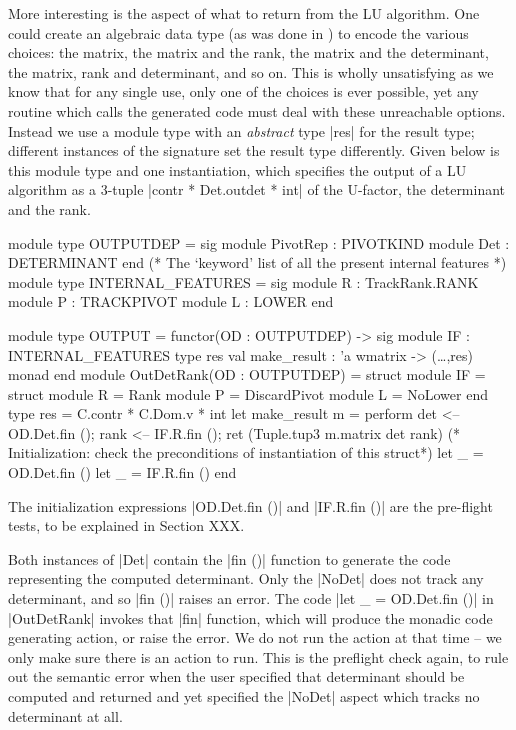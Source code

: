 \documentclass[draft]{elsart}
\begin{document}
More interesting is the aspect of what to return
from the LU algorithm.  One could create an algebraic data type (as
was done in \cite{Carette06}) to encode the various choices: the
matrix, the matrix and the rank, the matrix and the determinant, the
matrix, rank and determinant, and so on. This is wholly unsatisfying
as we know that for any single use, only one of the choices is ever
possible, yet any routine which calls the generated code must deal
with these unreachable options.  Instead we use a module type with an
\emph{abstract} type |res| for the result type; different instances of
the signature set the result type differently. Given below is this
module type and one instantiation, which specifies the output of a LU
algorithm as a 3-tuple |contr * Det.outdet * int| of the U-factor, the
determinant and the rank.

\begin{code2}
module type OUTPUTDEP = sig 
    module PivotRep : PIVOTKIND 
    module Det      : DETERMINANT
end
(* The `keyword' list of all the present internal features *)
module type INTERNAL_FEATURES = sig
  module R      : TrackRank.RANK
  module P      : TRACKPIVOT
  module L      : LOWER
end

module type OUTPUT = functor(OD : OUTPUTDEP) -> sig
  module IF : INTERNAL_FEATURES
  type res
  val make_result : 'a wmatrix -> (\dots,res) monad
end
module OutDetRank(OD : OUTPUTDEP) = struct
  module IF = struct
      module R   = Rank
      module P   = DiscardPivot
      module L   = NoLower end
  type res = C.contr * C.Dom.v * int
  let make_result m = perform
    det  <-- OD.Det.fin ();
    rank <-- IF.R.fin ();
    ret (Tuple.tup3 m.matrix det rank)
  (* Initialization: check the preconditions of instantiation of this struct*)
  let _ = OD.Det.fin ()
  let _ = IF.R.fin ()
end
\end{code2}

The initialization expressions |OD.Det.fin ()| and |IF.R.fin ()| are
the pre-flight tests, to be explained in Section XXX.

Both instances of |Det| contain the |fin ()| function to generate the
code representing the computed determinant. Only the |NoDet| does not
track any determinant, and so |fin ()| raises an error. The code 
|let _ = OD.Det.fin ()| in |OutDetRank| invokes that |fin| function, which will
produce the monadic code generating action, or raise the error. We do
not run the action at that time -- we only make sure there is an
action to run. This is the preflight check again, to rule out the
semantic error when the user specified that determinant should be computed
and returned and yet specified the |NoDet| aspect which tracks no
determinant at all.
\end{document}
